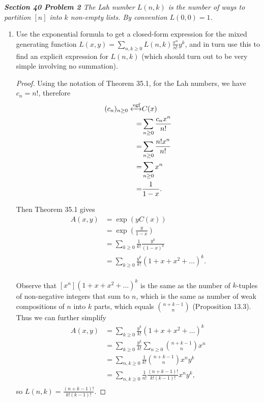 \documentclass{article}
\begin{document}
\it \textbf{Section 40 Problem 2} The Lah number $L(n,k)$ is the number of
  ways to partition $[n]$ into $k$ non-empty lists. By convention
  $L(0,0)=1$.

  \begin{enumerate}[label={(\alph*)}]
    \item Use the exponential formula to get a closed-form expression for
      the mixed generating function $L(x,y) =\sum_{n,k\geq0} L(n,k)
      \frac{x^n}{n!} y^k$, and in turn use this to find an explicit
      expression for $L(n,k)$ (which should turn out to be very simple
      involving no summation).

      \begin{proof}
        Using the notation of Theorem 35.1, for the Lah numbers, we have
        $c_n=n!$, therefore
        \begin{align*}
          (c_n)_{n\geq0}\xleftrightarrow{\text{egf}} &C(x)\\
          =&\sum_{n\geq0} \frac{c_nx^n}{n!}\\
          =&\sum_{n\geq0} \frac{n!x^n}{n!}\\
          =&\sum_{n\geq0} x^n\\
          =&\frac{1}{1-x}.\\
        \end{align*}

        Then Theorem 35.1 gives
        \begin{align*}
          A(x,y) &=\exp{\left(yC(x)\right)}\\
          &=\exp{\left(\frac{y}{1-x} \right)}\\
          &=\sum_{k\geq0} \frac{1}{k!} \frac{y^k}{(1-x)^k}\\
          &=\sum_{k\geq0} \frac{y^k}{k!} (1+x+x^2+\ldots)^k.\\
        \end{align*}

        Observe that $[x^n](1+x+x^2+\ldots)^k$ is the same as the number of
        $k$-tuples of non-negative integers that sum to $n$, which is the
        same as number of weak compositions of $n$ into $k$ parts, which
        equals $\binom{n+k-1}{n}$ (Proposition 13.3). Thus we can further
        simplify
        \begin{align*}
          A(x,y) &=\sum_{k\geq0} \frac{y^k}{k!} (1+x+x^2+\ldots)^k\\
          &=\sum_{k\geq0} \frac{y^k}{k!} \sum_{n\geq0} \binom{n+k-1}{n} x^n\\
          &=\sum_{n,k\geq0} \frac{1}{k!} \binom{n+k-1}{n} x^ny^k\\
          &=\sum_{n,k\geq0} \frac{1}{n!} \frac{(n+k-1)!}{k!(k-1)!}
            x^ny^k,\\
        \end{align*}
        so $L(n,k)=\frac{(n+k-1)!}{k!(k-1)!}$.
      \end{proof}
  \end{enumerate}
\end{document}
